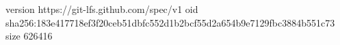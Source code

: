 version https://git-lfs.github.com/spec/v1
oid sha256:183e417718ef3f20ceb51dbfc552d1b2bcf55d2a654b9e7129fbc3884b551c73
size 626416
